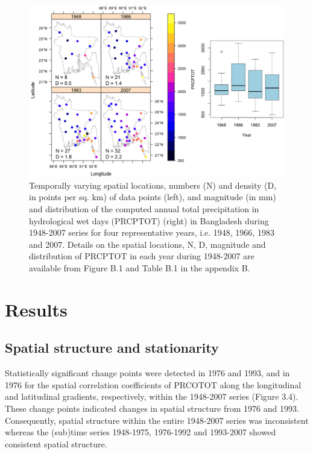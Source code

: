 \begin{figure}[t]
  \centering
  \includegraphics[width=\textwidth]{Figures/Fig_3_3.png}
  \caption{Temporally varying spatial locations, numbers (N) and density (D, in points per sq. km) of data points (left), and magnitude (in mm) and distribution of the computed annual total precipitation in hydrological wet days (PRCPTOT) (right) in Bangladesh during 1948-2007 series for four representative years, i.e. 1948, 1966, 1983 and 2007. Details on the spatial locations, N, D, magnitude and distribution of PRCPTOT in each year during 1948-2007 are available from Figure B.1 and Table B.1 in the appendix B.}
  \label{Fig_3_3}
\end{figure}

\section{Results}
\label{Results}

\subsection{Spatial structure and stationarity}
\label{Spatial structure and stationarity}

Statistically significant change points were detected in 1976 and 1993, and in 1976 for the spatial correlation coefficients of PRCOTOT along the longitudinal and latitudinal gradients, respectively, within the 1948-2007 series (Figure 3.4). These change points indicated changes in spatial structure from 1976 and 1993. Consequently, spatial structure within the entire 1948-2007 series was inconsistent whereas the (sub)time series 1948-1975, 1976-1992 and 1993-2007 showed consistent spatial structure.


